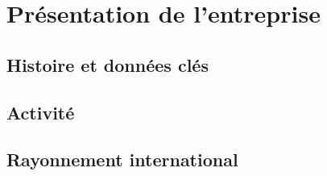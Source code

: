 \chapter{Présentation de l'entreprise}

\section{Histoire et données clés}

\section{Activité}

\section{Rayonnement international}
